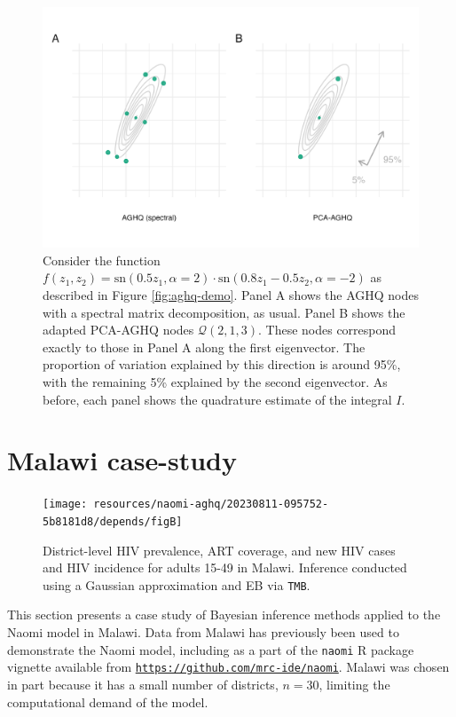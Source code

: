 \documentclass[a4paper, nobind]{templates/ociamthesis}
\begin{document}
\begin{figure}
\includegraphics[width=0.95\linewidth]{figures/naomi-aghq/pca-demo} \caption{Consider the function \(f(z_1, z_2) = \text{sn}(0.5 z_1, \alpha = 2) \cdot \text{sn}(0.8 z_1 - 0.5 z_2, \alpha = -2)\) as described in Figure \ref{fig:aghq-demo}. Panel A shows the AGHQ nodes with a spectral matrix decomposition, as usual. Panel B shows the adapted PCA-AGHQ nodes \(\mathcal{Q}(2, 1, 3)\). These nodes correspond exactly to those in Panel A along the first eigenvector. The proportion of variation explained by this direction is around 95\%, with the remaining 5\% explained by the second eigenvector. As before, each panel shows the quadrature estimate of the integral \(I\).}\label{fig:pca-demo}
\end{figure}

\hypertarget{malawi}{%
\section{Malawi case-study}\label{malawi}}



\begin{figure}
\texttt{[image: resources/naomi-aghq/20230811-095752-5b8181d8/depends/figB]} \caption{District-level HIV prevalence, ART coverage, and new HIV cases and HIV incidence for adults 15-49 in Malawi. Inference conducted using a Gaussian approximation and EB via \texttt{TMB}.}\label{fig:naomi-output}
\end{figure}

This section presents a case study of Bayesian inference methods applied to the Naomi model in Malawi.
Data from Malawi has previously been used to demonstrate the Naomi model, including as a part of the \texttt{naomi} R package vignette available from \href{https://github.com/mrc-ide/naomi}{\texttt{https://github.com/mrc-ide/naomi}}.
Malawi was chosen in part because it has a small number of districts, \(n = 30\), limiting the computational demand of the model.
\end{document}
